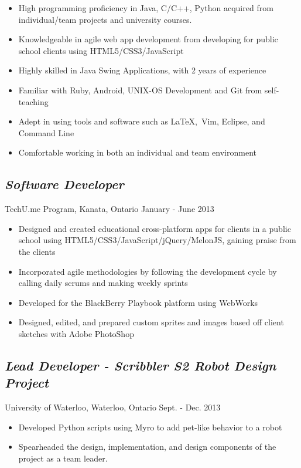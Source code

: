 \documentclass[10pt]{article}
\begin{document}
\begin{minipage}[t]{0.84\linewidth} 
	\begin{itemize}
		\item High programming proficiency in Java, C/C++, Python acquired from individual/team projects and university courses.
		\item Knowledgeable in agile web app development from developing for public school clients using HTML5/CSS3/JavaScript
		\item Highly skilled in Java Swing Applications, with 2 years of experience
		\item Familiar with Ruby, Android, UNIX-OS Development and Git from self-teaching
		\item Adept in using tools and software such as \LaTeX,\ Vim, Eclipse, and Command Line
		\item Comfortable working in both an individual and team environment
	\end{itemize}

	\subsection*{\textit{Software Developer}} \vspace{-6pt} 
		TechU.me Program, Kanata, Ontario \hspace{135pt} January - June 2013
		\begin{itemize}
			\item Designed and created educational cross-platform apps for clients in a public school using HTML5/CSS3/JavaScript/jQuery/MelonJS, gaining praise from the clients
			\item Incorporated agile methodologies by following the development cycle by calling daily scrums and 						making weekly sprints
			\item Developed for the BlackBerry Playbook platform using WebWorks
			\item Designed, edited, and prepared custom sprites and images based off client sketches with Adobe 							PhotoShop
		\end{itemize}
		
	\subsection*{\textit{Lead Developer - Scribbler S2 Robot Design Project}} \vspace{-6pt} 
		University of Waterloo, Waterloo, Ontario \hspace{125pt} Sept. - Dec. 2013
		\begin{itemize}
			\item Developed Python scripts using Myro to add pet-like behavior to a robot 
			\item Spearheaded the design, implementation, and design components of the project as a team leader.
		\end{itemize}
		

\end{minipage}
\end{document}
